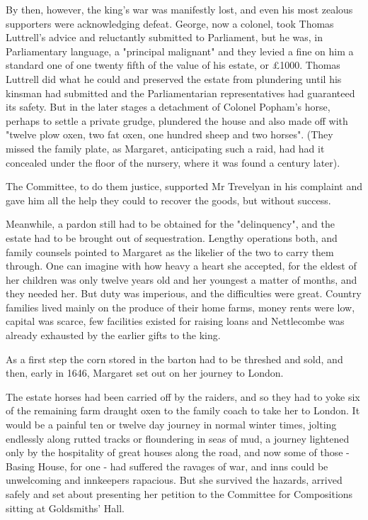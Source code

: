 By then, however, the king's war was manifestly lost, and even his most zealous supporters were acknowledging defeat. George, now a colonel, took Thomas Luttrell's advice and reluctantly submitted to Parliament, but he was, in Parliamentary language, a "principal malignant" and they levied a fine on him   a standard one   of one twenty fifth of the value of his estate, or £1000. Thomas Luttrell did what he could and preserved the estate from plundering until his kinsman had submitted and the Parliamentarian representatives had guaranteed its safety. But in the later stages a detachment of Colonel Popham's horse, perhaps to settle a private grudge, plundered the house and also made off with "twelve plow oxen, two fat oxen, one hundred sheep and two horses". (They missed the family plate, as Margaret, anticipating such a raid, had had it concealed under the floor of the nursery, where it was found a century later). 

The Committee, to do them justice, supported Mr Trevelyan in his complaint and gave him all the help they could to recover the goods, but without success.

Meanwhile, a pardon still had to be obtained for the "delinquency", and the estate had to be brought out of sequestration. Lengthy operations both, and family counsels pointed to Margaret as the likelier of the two to carry them through. One can imagine with how heavy a heart she accepted, for the eldest of her children was only twelve years old and her youngest a matter of months, and they needed her. But duty was imperious, and the difficulties were great. Country families lived mainly on the produce of their home farms, money rents were low, capital was scarce, few facilities existed for raising loans and Nettlecombe was already exhausted by the earlier gifts to the king.

As a first step the corn stored in the barton had to be threshed and sold, and then, early in 1646, Margaret set out on her journey to London.

The estate horses had been carried off by the raiders, and so they had to yoke six of the remaining farm draught oxen to the family coach to take her to London. It would be a painful ten or twelve day journey in normal winter times, jolting endlessly along rutted tracks or floundering in seas of mud, a journey lightened only by the hospitality of great houses along the road, and now some of those - Basing House, for one - had suffered the ravages of war, and inns could be unwelcoming and innkeepers rapacious. But she survived the hazards, arrived safely and set about presenting her petition to the Committee for Compositions sitting at Goldsmiths' Hall.


